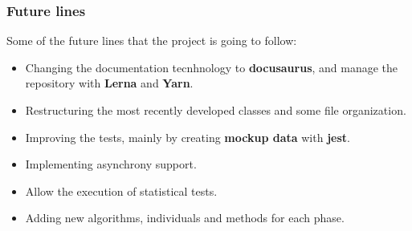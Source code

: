 \documentclass{beamer}
\begin{document}
\begin{frame}
\frametitle{Future lines}
 
 Some of the future lines that the project is going to follow:
 
 \begin{itemize}
     \item Changing the documentation tecnhnology to \textbf{docusaurus}, and manage the repository with \textbf{Lerna} and \textbf{Yarn}.
     \item Restructuring the most recently developed classes and some file organization.
     \item Improving the tests, mainly by creating \textbf{mockup data} with \textbf{jest}.
     \item Implementing asynchrony support.
     \item Allow the execution of statistical tests.
     \item Adding new algorithms, individuals and methods for each phase.
 \end{itemize}
 
\end{frame}
\end{document}
